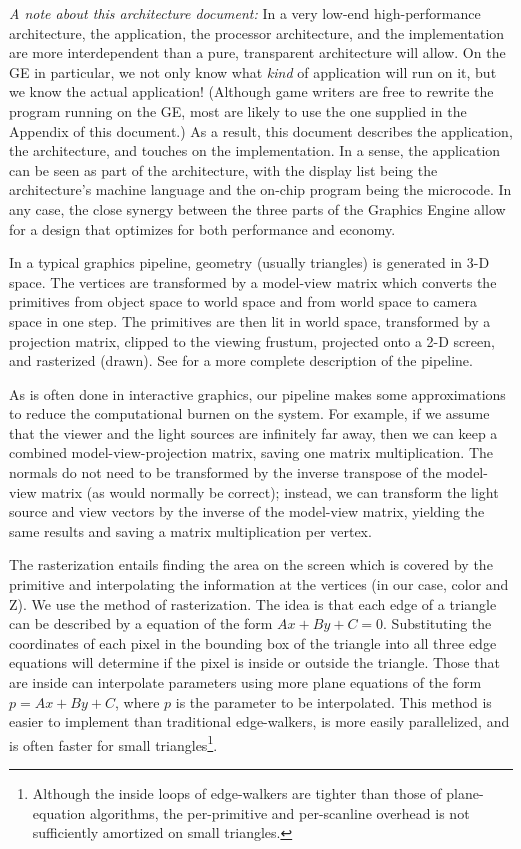 \documentclass{book}
\begin{document}
{\em A note about this architecture document:\/} In a very low-end
high-performance architecture, the application, the processor
architecture, and the implementation are more interdependent than a
pure, transparent architecture will allow.  On the GE in particular, we
not only know what {\em kind\/} of application will run on it, but we
know the actual application!  (Although game writers are free to rewrite
the program running on the GE, most are likely to use the one supplied
in the Appendix of this document.)  As a result, this document describes
the application, the architecture, and touches on the implementation.
In a sense, the application can be seen as part of the architecture,
with the display list being the architecture's machine language and the
on-chip program being the microcode.  In any case, the close synergy
between the three parts of the Graphics Engine allow for a design that
optimizes for both performance and economy.


In a typical graphics pipeline, geometry (usually triangles) is generated
in 3-D space.  The vertices are transformed by a model-view matrix which
converts the primitives from object space to world space and from world
space to camera space in one step.  The primitives are then lit in
world space, transformed by a projection matrix, clipped to the viewing
frustum, projected onto a 2-D screen, and rasterized (drawn).  See
\cite{foley} for a more complete description of the pipeline.

As is often done in interactive graphics, our pipeline makes some
approximations to reduce the computational burnen on the system.
For example, if we assume that the viewer and the light sources are
infinitely far away, then we can keep a combined model-view-projection
matrix, saving one matrix multiplication.  The normals do not need
to be transformed by the inverse transpose of the model-view matrix
(as would normally be correct); instead, we can transform the light
source and view vectors by the inverse of the model-view matrix,
yielding the same results and saving a matrix multiplication per
vertex.

The rasterization entails finding the area on the screen which is
covered by the primitive and interpolating the information at the
vertices (in our case, color and Z).  We use the  method of rasterization.  The idea is that
each edge of a triangle can be described by a equation of the form $Ax
+ By + C = 0$.  Substituting the coordinates of each pixel in the
bounding box of the triangle into all three edge equations will
determine if the pixel is inside or outside the triangle.  Those that
are inside can interpolate parameters using more plane equations of
the form $p = Ax + By + C$, where $p$ is the parameter to be
interpolated.  This method is easier to implement than traditional
edge-walkers, is more easily parallelized, and is often faster for
small triangles\footnote{Although the inside loops of edge-walkers are
tighter than those of plane-equation algorithms, the per-primitive and
per-scanline overhead is not sufficiently amortized on small
triangles.}.
\end{document}
